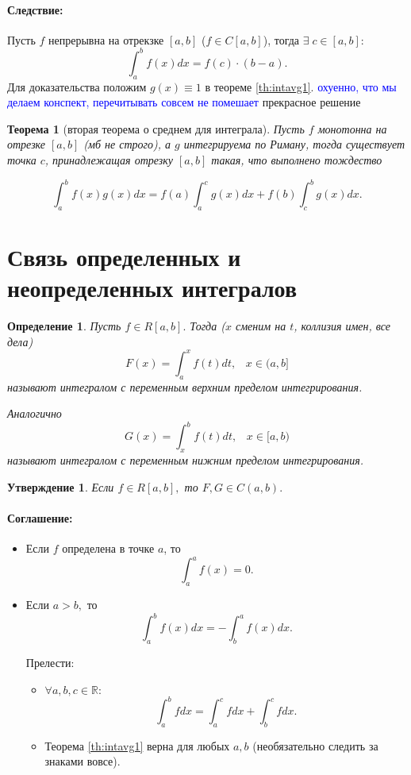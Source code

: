\documentclass{article}
\theoremstyle{plain}
\newtheorem{theorem}{Теорема}
\newtheorem{claim}{Утверждение}
\newtheorem{definition}{Определение}
\theoremstyle{definition}
\theoremstyle{remark}
\begin{document}
\paragraph{Следствие:} Пусть $f$ непрерывна на отрекзке $[a, b]$ ($f \in C[a, b]$), тогда $\exists \; c\in [a, b]$:
$$\int_a^b f(x)dx = f(c)\cdot (b-a).$$
Для доказательства положим $g(x) \equiv 1$ в теореме \ref{th:intavg1}.
\textcolor{blue}{охуенно, что мы делаем конспект, перечитывать совсем не помешает} прекрасное решение




\begin{theorem}[вторая теорема о среднем для интеграла]\label{th:intavg2}
Пусть $f$ монотонна на отрезке $[a, b]$ (мб  не строго), а $g$ интегрируема по Риману, тогда существует точка $c$, принадлежащая отрезку $[a, b]$ такая, что выполнено тождество

$$\int _a^b f(x)g(x)dx=f(a)\int_a^c g(x)dx + f(b)\int_c^b g(x)dx.$$

\end{theorem}


\section{Связь определенных и неопределенных интегралов}
\begin{definition}
Пусть $f\in R[a, b].$ Тогда  ($x$ сменим на $t$, коллизия имен, все дела)
\[
F(x) = \int_a^x f(t)dt,\;\;\;x\in(a,b]
\]
называют интегралом с переменным верхним пределом интегрирования.

Аналогично
\[
G(x) = \int_x^b f(t)dt,\;\;\;x\in[a,b)
\]
называют интегралом с переменным нижним пределом интегрирования.
\end{definition}
\begin{claim}
Если $f\in R[a, b],$ то $F, G \in C(a, b).$
\end{claim}

\paragraph{Соглашение:} 
\begin{itemize}
    \item Если $f$ определена в точке $a$, то $$\int_a^a f(x) = 0.$$
    \item Если $a > b,$ то $$\int_a^b f(x)dx = -\int_b^a f(x)dx.$$
    
Прелести: 
\begin{itemize}
    \item $\forall a, b, c \in \mathbb{R}:$ $$\int_a^b fdx = \int_a^c fdx + \int_b^c fdx.$$
    \item Теорема \ref{th:intavg1} верна для любых $ a, b$ (необязательно следить за знаками вовсе).
\end{itemize}
\end{itemize}
\end{document}
